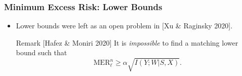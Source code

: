 \documentclass[usenames,dvipsnames, 10pt]{beamer}
\makeatletter
\newcommand{\distas}[1]{\mathbin{\overset{#1}{\kern\z@\sim}}}%
\makeatother
\begin{document}
%
%

\begin{frame}
	\frametitle{Minimum Excess Risk: Lower Bounds}
	\begin{itemize}
		\item Lower bounds were left as an open problem in {\scriptsize[Xu \& Raginsky 2020]}.
		\pause
		\begin{block}{Remark {\scriptsize[Hafez \& Moniri 2020]}}
			It is \textit{impossible} to find a matching lower bound such that
			\begin{equation*}
				\text{MER}_\ell^n \geq \alpha\sqrt{I(Y; W | S, X)}.
			\end{equation*}
		\end{block}
		
		
		
	\end{itemize}
\end{frame}
\end{document}
